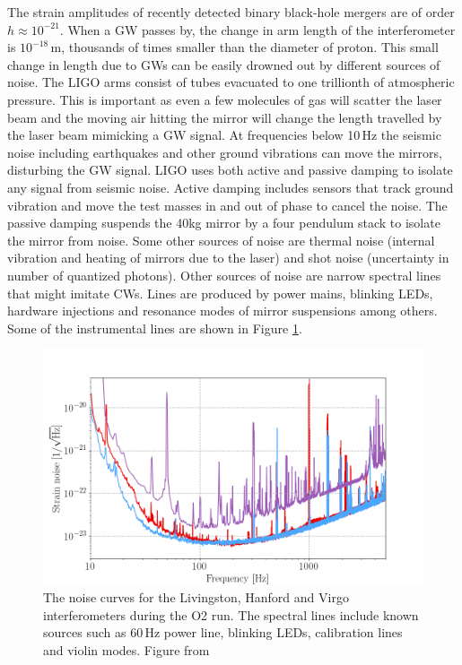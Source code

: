 \documentclass{ttuthes2007}
\begin{document}
The strain amplitudes of recently detected binary black-hole mergers are
of order $h \approx10^{-21}$. When a \ac{GW} passes by, the change in arm length
of the
interferometer is $10^{-18}$\,m, thousands of times smaller than the diameter of proton. This small
change in length due to \acp{GW} can be easily drowned out by different sources of
noise. The LIGO arms consist of tubes evacuated to one trillionth of
atmospheric pressure. This is important as even a few molecules of gas will
scatter the laser beam and the moving air hitting the mirror will change the
length travelled by the laser beam mimicking a \ac{GW} signal.
 At frequencies below 10\,Hz the seismic noise including earthquakes and other ground vibrations can move the mirrors, disturbing the \ac{GW}
signal. LIGO uses both active and passive damping to isolate any signal from
seismic noise.
Active damping includes sensors that track ground vibration and move the
test masses in and out of phase to cancel the noise. The passive damping suspends the
40kg mirror by a four pendulum stack to isolate the mirror from noise. Some other sources of
noise are thermal noise (internal vibration and heating of mirrors due to the laser)
and shot noise (uncertainty in number of quantized photons). 
Other sources of noise are narrow spectral lines that might imitate \acp{CW}.
Lines are produced by power
mains, blinking LEDs, hardware injections and resonance modes of mirror
suspensions among others. Some of the instrumental lines are shown in Figure
\ref{fig:CWnoise}.
\begin{figure}[bht!]
	\includegraphics[width=\textwidth]{figure/CWnoise.png}
	\caption{The noise curves for the Livingston, Hanford and Virgo
interferometers during the \ac{O2} run. The spectral lines include known sources such as
60\,Hz power line, blinking LEDs, calibration lines and violin modes. Figure from
~\cite{Abbott_2019} }
	\label{fig:CWnoise}
\end{figure}
\end{document}
